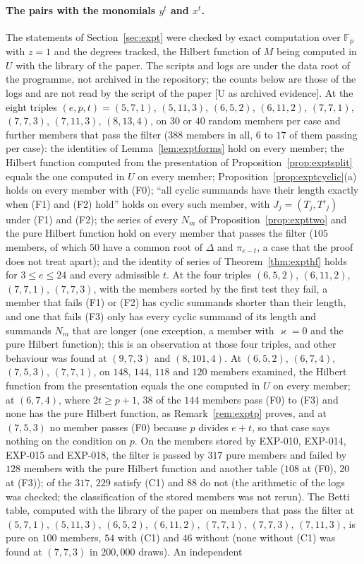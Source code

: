 \documentclass[11pt]{article}
\theoremstyle{definition}
\theoremstyle{remark}
\newcommand{\EXP}[1]{\mbox{EXP-#1}}
\newcommand{\F}{\mathbb{F}}
\begin{document}
\paragraph{The pairs with the monomials $y^t$ and $x^t$.} The statements of Section~\ref{sec:expt} were checked by exact computation over $\F_p$ with $z=1$ and the degrees tracked, the Hilbert function of $M$ being computed in $U$ with the library of the paper. The scripts and logs are under the data root of the programme, not archived in the repository; the counts below are those of the logs and are not read by the script of the paper [U as archived evidence]. At the eight triples $(e,p,t)=(5,7,1)$, $(5,11,3)$, $(6,5,2)$, $(6,11,2)$, $(7,7,1)$, $(7,7,3)$, $(7,11,3)$, $(8,13,4)$, on $30$ or $40$ random members per case and further members that pass the filter ($388$ members in all, $6$ to $17$ of them passing per case): the identities of Lemma~\ref{lem:exptforms} hold on every member; the Hilbert function computed from the presentation of Proposition~\ref{prop:exptsplit} equals the one computed in $U$ on every member; Proposition~\ref{prop:exptcyclic}(a) holds on every member with (F0); ``all cyclic summands have their length exactly when (F1) and (F2) hold'' holds on every such member, with $J_j=(T_j,T'_j)$ under (F1) and (F2); the series of every $N_m$ of Proposition~\ref{prop:expttwo} and the pure Hilbert function hold on every member that passes the filter ($105$ members, of which $50$ have a common root of $\Delta$ and $\pi_{e-t}$, a case that the proof does not treat apart); and the identity of series of Theorem~\ref{thm:expthf} holds for $3\le e\le24$ and every admissible $t$. At the four triples $(6,5,2)$, $(6,11,2)$, $(7,7,1)$, $(7,7,3)$, with the members sorted by the first test they fail, a member that fails (F1) or (F2) has cyclic summands shorter than their length, and one that fails (F3) only has every cyclic summand of its length and summands $N_m$ that are longer (one exception, a member with $\varkappa=0$ and the pure Hilbert function); this is an observation at those four triples, and other behaviour was found at $(9,7,3)$ and $(8,101,4)$. At $(6,5,2)$, $(6,7,4)$, $(7,5,3)$, $(7,7,1)$, on $148$, $144$, $118$ and $120$ members examined, the Hilbert function from the presentation equals the one computed in $U$ on every member; at $(6,7,4)$, where $2t\ge p+1$, $38$ of the $144$ members pass (F0) to (F3) and none has the pure Hilbert function, as Remark~\ref{rem:exptp} proves, and at $(7,5,3)$ no member passes (F0) because $p$ divides $e+t$, so that case says nothing on the condition on $p$. On the members stored by \EXP{010}, \EXP{014}, \EXP{015} and \EXP{018}, the filter is passed by $317$ pure members and failed by $128$ members with the pure Hilbert function and another table ($108$ at (F0), $20$ at (F3)); of the $317$, $229$ satisfy (C1) and $88$ do not (the arithmetic of the logs was checked; the classification of the stored members was not rerun). The Betti table, computed with the library of the paper on members that pass the filter at $(5,7,1)$, $(5,11,3)$, $(6,5,2)$, $(6,11,2)$, $(7,7,1)$, $(7,7,3)$, $(7,11,3)$, is pure on $100$ members, $54$ with (C1) and $46$ without (none without (C1) was found at $(7,7,3)$ in $200{,}000$ draws). An independent 
\end{document}
